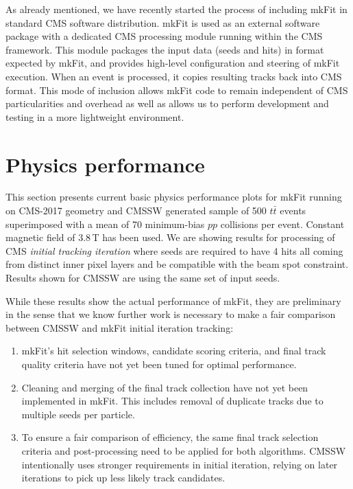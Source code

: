 \documentclass{webofc}
\def\mkfit{mkFit\xspace}
\begin{document}
As already mentioned, we have recently started the process of including \mkfit
in standard CMS software distribution. \mkfit is used as an external software
package with a dedicated CMS processing module running within the CMS
framework. This module packages the input data (seeds and hits) in format
expected by \mkfit, and provides high-level configuration and steering of
\mkfit execution. When an event is processed, it copies resulting tracks back
into CMS format. This mode of inclusion allows \mkfit code to remain
independent of CMS particularities and overhead as well as allows us to
perform development and testing in a more lightweight environment.


\section{Physics performance}
\label{sec:phys-perf}

This section presents current basic physics performance plots for \mkfit
running on CMS-2017 geometry and CMSSW generated sample of 500 $t\bar{t}$
events superimposed with a mean of 70 minimum-bias $pp$ collisions per event.
Constant magnetic field of 3.8\,T has been used. We are showing
results for processing of CMS \emph{initial tracking iteration} where seeds are
required to have 4 hits all coming from distinct inner pixel layers and be
compatible with the beam spot constraint. Results shown for CMSSW are using
the same set of input seeds.

While these results show the actual performance of \mkfit, they are
preliminary in the sense that we know further work is necessary to make a fair
comparison between CMSSW and \mkfit initial iteration tracking:
\begin{enumerate}[--]\topsep-2pt\itemsep-2pt
\item \mkfit's hit selection windows, candidate scoring criteria, and final track
  quality criteria have not yet been tuned for optimal performance.
\item Cleaning and merging of the final track collection have not yet been
  implemented in \mkfit. This includes removal of duplicate tracks due to
  multiple seeds per particle.
\item To ensure a fair comparison of efficiency, the same final track selection
  criteria and post-processing need to be applied for both algorithms. CMSSW
  intentionally uses stronger requirements in initial iteration, relying on later
  iterations to pick up less likely track candidates.
\end{enumerate}
\end{document}

